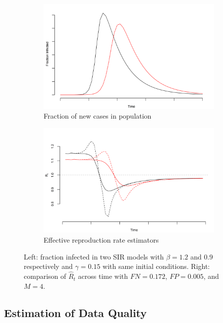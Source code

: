 \documentclass[11pt]{amsart}
\begin{document}
\begin{figure}
\centering
\begin{subfigure}{.5\textwidth}
  \centering
  \includegraphics[width=.9\linewidth]{../methods/figs/sir.png}
  \caption{Fraction of new cases in population}
  \label{fig:fracpop}
\end{subfigure}%
\begin{subfigure}{.5\textwidth}
  \centering
  \includegraphics[width=.9\linewidth]{../methods/figs/sir_rt_comparison.png}
  \caption{Effective reproduction rate estimators}
  \label{fig:eff}
\end{subfigure}
\caption{Left: fraction infected in two SIR models with $\beta = 1.2$ and $0.9$ respectively and $\gamma = 0.15$ with same initial conditions. Right: comparison of $\hat R_t$ across time with $FN = 0.172$, $FP = 0.005$, and $M = 4$.}
\label{fig:comparison}
\end{figure}

\subsection{Estimation of Data Quality}
\label{section:est_dq}
\end{document}
